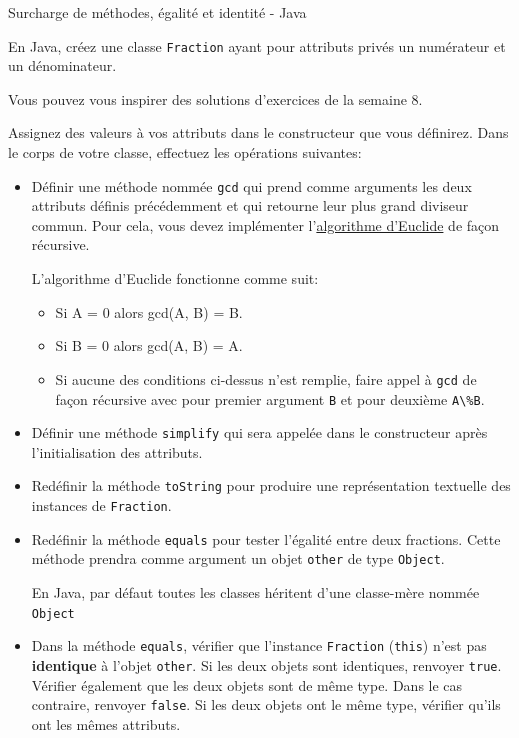 \begin{Exercice}[30 minutes]{Surcharge de méthodes, égalité et identité - Java}

En Java, créez une classe \lstinline{Fraction} ayant pour attributs privés un numérateur et un dénominateur. 
\begin{conseil}
	Vous pouvez vous inspirer des solutions d'exercices de la semaine 8.
\end{conseil}
Assignez des valeurs à vos attributs dans le constructeur que vous définirez. Dans le corps de votre classe, effectuez les opérations suivantes:
\begin{itemize}
	\item Définir une méthode nommée \lstinline{gcd} qui prend comme arguments les deux attributs définis précédemment et qui retourne leur plus grand diviseur commun. Pour cela, vous devez implémenter l'\href{https://fr.wikipedia.org/wiki/Algorithme_d%27Euclide#:~:text=le%20code%5D-,Principe}{algorithme d'Euclide} de façon récursive.
	\begin{conseil}
		L'algorithme d'Euclide fonctionne comme suit:
		\begin{itemize}
			\item Si A = 0 alors gcd(A, B) = B.
			\item Si B = 0 alors gcd(A, B) = A.
			\item Si aucune des conditions ci-dessus n'est remplie, faire appel à \lstinline{gcd} de façon récursive avec pour premier argument \lstinline{B} et pour deuxième \lstinline{A\%B}.
		\end{itemize}
	\end{conseil}
	\item Définir une méthode \lstinline{simplify} qui sera appelée dans le constructeur après l'initialisation des attributs. 
	\item Redéfinir la méthode \lstinline{toString} pour produire une représentation textuelle des instances de \lstinline{Fraction}.
	\item Redéfinir la méthode \lstinline{equals} pour tester l'égalité entre deux fractions. Cette méthode prendra comme argument un objet \lstinline{other} de type \lstinline{Object}.
	\begin{conseil}
		En Java, par défaut toutes les classes héritent d'une classe-mère nommée \lstinline{Object}
	\end{conseil}
	\item Dans la méthode \lstinline{equals}, vérifier que l'instance \lstinline{Fraction} (\lstinline{this}) n'est pas \textbf{identique} à l'objet \lstinline{other}. Si les deux objets sont identiques, renvoyer \lstinline{true}. Vérifier également que les deux objets sont de même type. Dans le cas contraire, renvoyer \lstinline{false}. Si les deux objets ont le même type, vérifier qu'ils ont les mêmes attributs. 

\end{itemize}
\end{Exercice}
